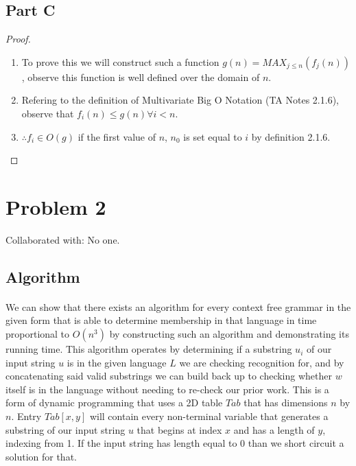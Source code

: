 \documentclass{article}
\begin{document}
\subsection{Part C}
\begin{proof}

      \begin{enumerate}
            \item To prove this we will construct such a function $g(n) = MAX_{j \leq
                                    n}(f_j(n))$, observe this function is well defined over the domain of $n$.
            \item Refering to the definition of Multivariate Big O Notation (TA Notes 2.1.6),
                  observe that $f_i(n) \leq g(n) \forall i < n$.
            \item $\therefore f_i \in O(g)$ if the first value of $n$, $n_0$ is set equal to
                  $i$ by definition 2.1.6.
      \end{enumerate}
\end{proof}

\newpage
\section{Problem 2}
Collaborated with: No one.

\subsection{Algorithm}

\paragraph{\indent} We can show that there exists an algorithm for every context free grammar
in the given form that is able to determine membership in that language
in time proportional to $O(n^3)$ by constructing such an algorithm and
demonstrating its running time. This algorithm
operates by determining if a substring $u_i$ of our input string $u$
is in the given language $L$ we are checking recognition for,
and by concatenating said valid substrings we can build back up to checking
whether $w$ itself is in the language without needing to re-check our prior work. This is
a form of dynamic programming that uses a 2D table $Tab$ that has dimensions $n$ by $n$.
Entry $Tab[x,y]$ will contain every non-terminal variable that generates a substring of our input string
$u$ that begins at index $x$ and has a length of $y$, indexing from 1. If the input string
has length equal to 0 than we short circuit a solution for that.
\end{document}
